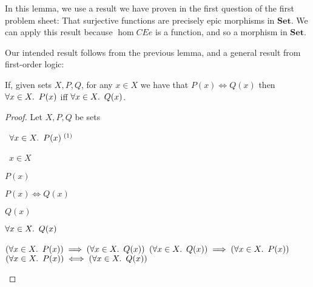 In this lemma, we use a result we have proven in the first question of the first problem sheet: That surjective functions are precisely epic morphisms in $\mathbf{Set}$. We can apply this result because $\hom{C}{E}{e}$ is a function, and so a morphism in $\mathbf{Set}$.

Our intended result follows from the previous lemma, and a general result from first-order logic:

\begin{lemma}\label{lemma:epic-preserve-2}
  If, given sets $X, P, Q$, for any $x\in X$ we have that ${P(x) \iff Q(x)}$ then $\forall x\in X\ldotp~P(x)$ iff $\forall x\in X\ldotp~Q(x)$.

  \begin{proof}
    Let $X, P, Q$ be sets
    \begin{itemize}
      \step
        \begin{itemize}
          \subp{\star}
            \Ass~$\forall x\in X\ldotp~P(x)^{\text~(1)}$
            \marginnote{\Hyp}

          \step
            \begin{itemize}
              \subp{\dagger}
                \Let~$x\in X$
                \marginnote{\Hyp}

              \step
                $P(x)$

              \step
                $P(x)\iff Q(x)$

              \step[\imps]
                $Q(x)$
                \marginnote{$\iffs$-\Elim}
            \end{itemize}

            \step[\imps]
              $\forall x\in X\ldotp~Q(x)$
              \marginnote{$\forall$-\Intro}
        \end{itemize}

      \step[\imps]
        $(\forall x\in X\ldotp~P(x))\implies(\forall x\in X\ldotp~Q(x))$
        \marginnote{$\imps$-\Intro}
      \step[\phantom{\imps}]
        $(\forall x\in X\ldotp~Q(x))\implies(\forall x\in X\ldotp~P(x))$
      \step[\iffs]
        $(\forall x\in X\ldotp~P(x))\iff(\forall x\in X\ldotp~Q(x))$
        \qedhere
        \marginnote{$\iffs$-\Intro}
    \end{itemize}
  \end{proof}
\end{lemma}

